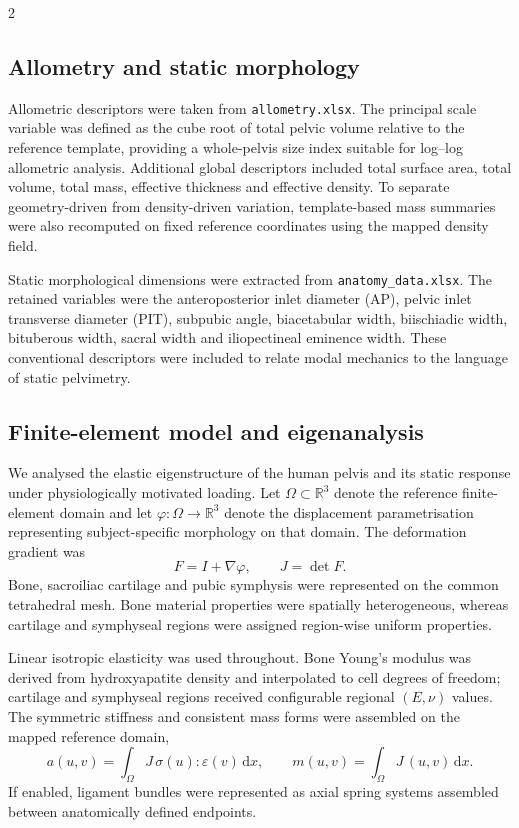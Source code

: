 \documentclass[openacc]{rsproca_new}
\begin{document}
\begin{multicols}{2}
\subsection{Allometry and static morphology}

Allometric descriptors were taken from \texttt{allometry.xlsx}. The principal scale variable was defined as the cube root of total pelvic volume relative to the reference template, providing a whole-pelvis size index suitable for log--log allometric analysis. Additional global descriptors included total surface area, total volume, total mass, effective thickness and effective density. To separate geometry-driven from density-driven variation, template-based mass summaries were also recomputed on fixed reference coordinates using the mapped density field.

Static morphological dimensions were extracted from \texttt{anatomy\_data.xlsx}. The retained variables were the anteroposterior inlet diameter (AP), pelvic inlet transverse diameter (PIT), subpubic angle, biacetabular width, biischiadic width, bituberous width, sacral width and iliopectineal eminence width. These conventional descriptors were included to relate modal mechanics to the language of static pelvimetry.

\subsection{Finite-element model and eigenanalysis}

We analysed the elastic eigenstructure of the human pelvis and its static response under physiologically motivated loading. Let $\Omega \subset \mathbb{R}^{3}$ denote the reference finite-element domain and let $\varphi:\Omega \rightarrow \mathbb{R}^{3}$ denote the displacement parametrisation representing subject-specific morphology on that domain. The deformation gradient was
\begin{equation}
F = I + \nabla \varphi, \qquad J = \det F.
\end{equation}
Bone, sacroiliac cartilage and pubic symphysis were represented on the common tetrahedral mesh. Bone material properties were spatially heterogeneous, whereas cartilage and symphyseal regions were assigned region-wise uniform properties.

Linear isotropic elasticity was used throughout. Bone Young's modulus was derived from hydroxyapatite density and interpolated to cell degrees of freedom; cartilage and symphyseal regions received configurable regional $(E,\nu)$ values. The symmetric stiffness and consistent mass forms were assembled on the mapped reference domain,
\begin{equation}
a(u,v)=\int_{\Omega} J\,\sigma(u):\varepsilon(v)\,\mathrm{d}x,
\qquad
m(u,v)=\int_{\Omega} J\,(u,v)\,\mathrm{d}x.
\end{equation}
If enabled, ligament bundles were represented as axial spring systems assembled between anatomically defined endpoints.


\end{multicols}
\end{document}
